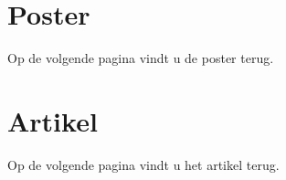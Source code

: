 \chapter{Poster}
\label{app:b}
Op de volgende pagina vindt u de poster terug.

\newpage
%

\chapter{Artikel}

Op de volgende pagina vindt u het artikel terug.

\newpage


